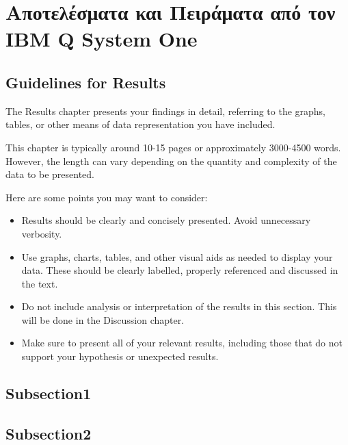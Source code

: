 \chapter{Αποτελέσματα και Πειράματα από τον IBM Q System One}

\section*{Guidelines for Results}
The Results chapter presents your findings in detail, referring to the graphs, tables, or other means of data representation you have included. 

This chapter is typically around 10-15 pages or approximately 3000-4500 words. However, the length can vary depending on the quantity and complexity of the data to be presented.

Here are some points you may want to consider:
\begin{itemize}
    \item Results should be clearly and concisely presented. Avoid unnecessary verbosity.
    \item Use graphs, charts, tables, and other visual aids as needed to display your data. These should be clearly labelled, properly referenced and discussed in the text.
    \item Do not include analysis or interpretation of the results in this section. This will be done in the Discussion chapter.
    \item Make sure to present all of your relevant results, including those that do not support your hypothesis or unexpected results. 
\end{itemize}


\section{Subsection1}

\section{Subsection2}
